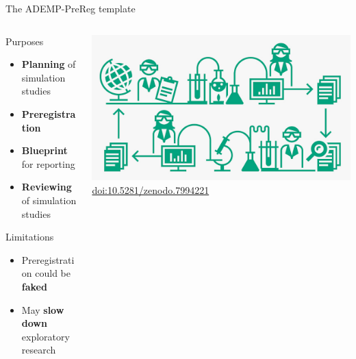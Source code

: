 \documentclass[english, 12pt, aspectratio=169]{beamer}
\begin{document}
\begin{frame}{The ADEMP-PreReg template}
  \begin{columns}
    \begin{column}{0.6\textwidth}

  \begin{block}{Purposes}
    \begin{itemize}
      \pause
      \item \alert{\textbf{Planning}} of simulation studies
      \pause
      \item \alert{\textbf{Preregistration}}
      \pause
      \item \alert{\textbf{Blueprint}} for reporting
      \pause
      \item \alert{\textbf{Reviewing}} of simulation studies
    \end{itemize}
  \end{block}

  \begin{block}{Limitations}
    \begin{itemize}
    \pause
      \item Preregistration could be \alert{\textbf{faked}}
    \pause
      \item May \alert{\textbf{slow down}} exploratory research
    \end{itemize}

  \end{block}
  \end{column}
  \begin{column}{0.4\textwidth}
\centering
    \includegraphics[width=\textwidth]{pics/CRScycle.JPG} \\
    {\tiny \color{gray} \href{https://zenodo.org/doi/10.5281/zenodo.7994221}{doi:10.5281/zenodo.7994221}}


  \end{column}
\end{columns}
\end{frame}
\end{document}
